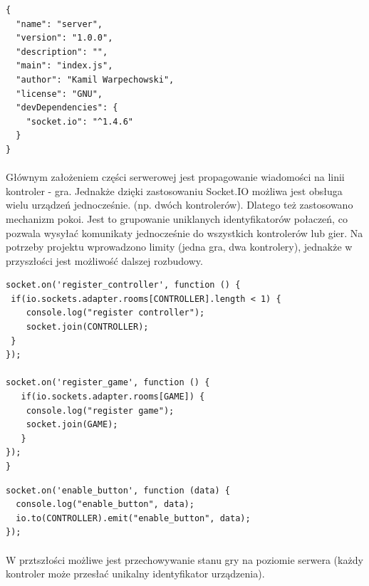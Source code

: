 \begin{lstlisting}[language=CSharp]
{
  "name": "server",
  "version": "1.0.0",
  "description": "",
  "main": "index.js",
  "author": "Kamil Warpechowski",
  "license": "GNU",
  "devDependencies": {
    "socket.io": "^1.4.6"
  }
}
\end{lstlisting}

\paragraph{}
Głównym założeniem części serwerowej jest propagowanie wiadomości na linii kontroler - gra. Jednakże dzięki zastosowaniu Socket.IO możliwa jest obsługa wielu urządzeń jednocześnie. (np. dwóch kontrolerów). Dlatego też zastosowano mechanizm pokoi. Jest to grupowanie uniklanych identyfikatorów połaczeń, co pozwala wysyłać komunikaty jednocześnie do wszystkich kontrolerów lub gier. Na potrzeby projektu wprowadzono limity (jedna gra, dwa kontrolery), jednakże w przyszłości jest możliwość dalszej rozbudowy.

\begin{lstlisting}[language=CSharp]
socket.on('register_controller', function () {
 if(io.sockets.adapter.rooms[CONTROLLER].length < 1) {
	console.log("register controller");
	socket.join(CONTROLLER);
 }
});

socket.on('register_game', function () {
   if(io.sockets.adapter.rooms[GAME]) {
	console.log("register game");
	socket.join(GAME);
   }
});
}
\end{lstlisting}

\begin{lstlisting}[language=CSharp]
socket.on('enable_button', function (data) {
  console.log("enable_button", data);
  io.to(CONTROLLER).emit("enable_button", data);
});
\end{lstlisting}
\paragraph{}
W prztszłości możliwe jest przechowywanie stanu gry na poziomie serwera (każdy kontroler może przesłać unikalny identyfikator urządzenia).